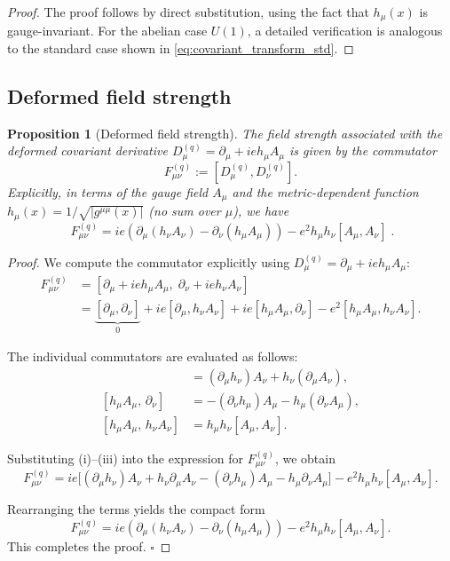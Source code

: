 \documentclass[12pt,a4paper]{article}
\theoremstyle{plain}
\newtheorem{proposition}[theorem]{Proposition}
\theoremstyle{definition}
\begin{document}
\begin{proof}
The proof follows by direct substitution, using the fact that \(h_\mu(x)\) is gauge-invariant. For the abelian case \(U(1)\), a detailed verification is analogous to the standard case shown in \eqref{eq:covariant_transform_std}.
\end{proof}

\subsection{Deformed field strength}
\label{sec:fieldstrength}

\begin{proposition}[Deformed field strength]
\label{prop:deformed_field_strength}
The field strength associated with the deformed covariant derivative \(D_\mu^{(q)} = \partial_\mu + ie h_\mu A_\mu\) is given by the commutator
\begin{equation}
F_{\mu\nu}^{(q)} := \left[ D_\mu^{(q)}, D_\nu^{(q)} \right]. \label{eq:field_strength_def}
\end{equation}
Explicitly, in terms of the gauge field \(A_\mu\) and the metric-dependent function \(h_\mu(x) = 1/\sqrt{|g^{\mu\mu}(x)|}\) (no sum over \(\mu\)), we have
\begin{equation}
\boxed{\; F_{\mu\nu}^{(q)} = ie\left( \partial_\mu(h_\nu A_\nu) - \partial_\nu(h_\mu A_\mu) \right) - e^2 h_\mu h_\nu [A_\mu, A_\nu] \; }. \label{eq:F_final}
\end{equation}
\end{proposition}

\begin{proof}
We compute the commutator explicitly using \(D_\mu^{(q)} = \partial_\mu + ie h_\mu A_\mu\):
\begin{align*}
F_{\mu\nu}^{(q)} &= \left[ \partial_\mu + ie h_\mu A_\mu,\; \partial_\nu + ie h_\nu A_\nu \right] \\
&= \underbrace{[\partial_\mu,\partial_\nu]}_{0} 
+ ie [\partial_\mu, h_\nu A_\nu] 
+ ie [h_\mu A_\mu, \partial_\nu] 
- e^2 [h_\mu A_\mu, h_\nu A_\nu].
\end{align*}

The individual commutators are evaluated as follows:
\begin{align}
[\partial_\mu,\, h_\nu A_\nu] &= (\partial_\mu h_\nu) A_\nu + h_\nu (\partial_\mu A_\nu), \tag{i}\\
[h_\mu A_\mu,\, \partial_\nu] &= -(\partial_\nu h_\mu) A_\mu - h_\mu (\partial_\nu A_\mu), \tag{ii}\\
[h_\mu A_\mu,\, h_\nu A_\nu] &= h_\mu h_\nu [A_\mu, A_\nu]. \tag{iii}
\end{align}

Substituting (i)–(iii) into the expression for \(F_{\mu\nu}^{(q)}\), we obtain
\[
F_{\mu\nu}^{(q)} = ie\Big[ (\partial_\mu h_\nu)A_\nu + h_\nu \partial_\mu A_\nu - (\partial_\nu h_\mu)A_\mu - h_\mu \partial_\nu A_\mu \Big] - e^2 h_\mu h_\nu [A_\mu, A_\nu].
\]

Rearranging the terms yields the compact form
\[
F_{\mu\nu}^{(q)} = ie\left( \partial_\mu(h_\nu A_\nu) - \partial_\nu(h_\mu A_\mu) \right) - e^2 h_\mu h_\nu [A_\mu, A_\nu].
\]
This completes the proof. \hfill \(\square\)
\end{proof}
\end{document}
